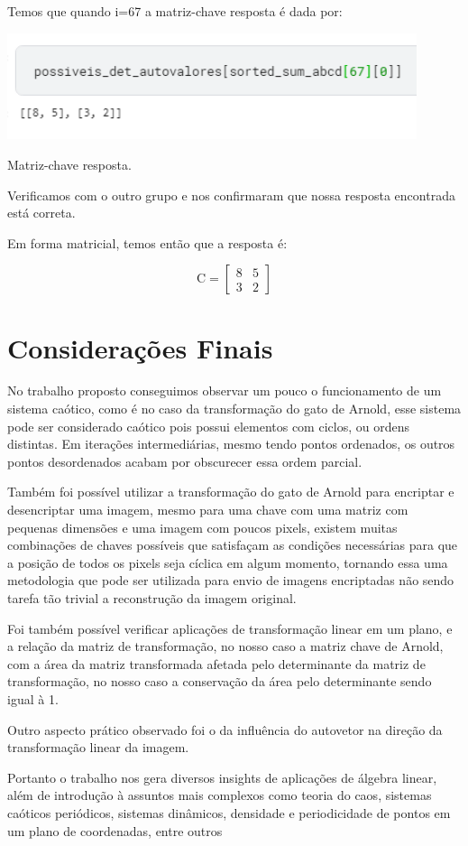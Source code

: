 \documentclass[a4paper, 12pt]{article}
\begin{document}
Temos que quando i=67 a matriz-chave resposta é dada por:

\begin{center}
    \includegraphics[width=12cm]{06_matriz_resposta.PNG}
    
    Matriz-chave resposta.
\end{center}

Verificamos com o outro grupo e nos confirmaram que nossa resposta encontrada está correta.

Em forma matricial, temos então que a resposta é:

$$\boxed{\ \ \mathrm{C}=\begin{bmatrix}
8&5\\
3&2
\end{bmatrix}\ \ }$$


\section{Considerações Finais}

No trabalho proposto conseguimos observar um pouco o funcionamento de um sistema caótico, como é no caso da transformação do gato de Arnold, esse sistema pode ser considerado caótico pois possui elementos com ciclos, ou ordens distintas. Em iterações intermediárias, mesmo tendo pontos ordenados, os outros pontos desordenados acabam por obscurecer essa ordem parcial.

Também foi possível utilizar a transformação do gato de Arnold para encriptar e desencriptar uma imagem, mesmo para uma chave com uma matriz com pequenas dimensões e uma imagem com poucos pixels, existem muitas combinações de chaves possíveis que satisfaçam as condições necessárias para que a posição de todos os pixels seja cíclica em algum momento, tornando essa uma metodologia que pode ser utilizada para envio de imagens encriptadas não sendo tarefa tão trivial a reconstrução da imagem original.

Foi também possível verificar aplicações de transformação linear em um plano, e a relação da matriz de transformação, no nosso caso a matriz chave de Arnold, com a área da matriz transformada afetada pelo determinante da matriz de transformação, no nosso caso a conservação da área pelo determinante sendo igual à 1.

Outro aspecto prático observado foi o da influência do autovetor na direção da transformação linear da imagem.

Portanto o trabalho nos gera diversos insights de aplicações de álgebra linear, além de introdução à assuntos mais complexos como teoria do caos, sistemas caóticos periódicos, sistemas dinâmicos, densidade e periodicidade de pontos em um plano de coordenadas, entre outros


\end{document}
